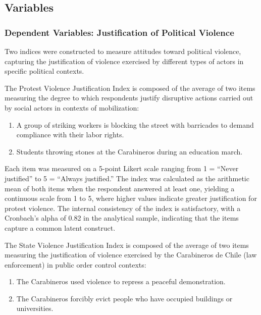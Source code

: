 \documentclass[
  13pt,
]{article}
\begin{document}
\subsection{Variables}\label{variables}

\subsubsection{Dependent Variables: Justification of Political
Violence}\label{dependent-variables-justification-of-political-violence}

Two indices were constructed to measure attitudes toward political
violence, capturing the justification of violence exercised by different
types of actors in specific political contexts.

The Protest Violence Justification Index is composed of the average of
two items measuring the degree to which respondents justify disruptive
actions carried out by social actors in contexts of mobilization:

\begin{enumerate}
\def\labelenumi{\arabic{enumi}.}
\item
  A group of striking workers is blocking the street with barricades to
  demand compliance with their labor rights.
\item
  Students throwing stones at the Carabineros during an education march.
\end{enumerate}

Each item was measured on a 5-point Likert scale ranging from 1 =
``Never justified'' to 5 = ``Always justified.'' The index was
calculated as the arithmetic mean of both items when the respondent
answered at least one, yielding a continuous scale from 1 to 5, where
higher values indicate greater justification for protest violence. The
internal consistency of the index is satisfactory, with a Cronbach's
alpha of 0.82 in the analytical sample, indicating that the items
capture a common latent construct.

The State Violence Justification Index is composed of the average of two
items measuring the justification of violence exercised by the
Carabineros de Chile (law enforcement) in public order control contexts:

\begin{enumerate}
\def\labelenumi{\arabic{enumi}.}
\item
  The Carabineros used violence to repress a peaceful demonstration.
\item
  The Carabineros forcibly evict people who have occupied buildings or
  universities.
\end{enumerate}
\end{document}
